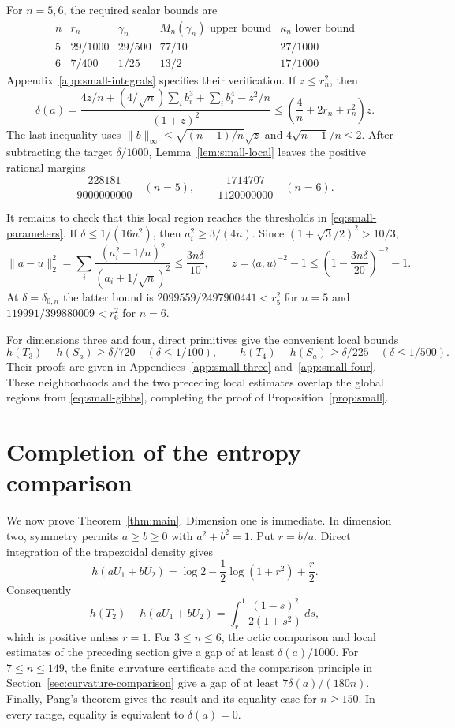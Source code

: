 \documentclass[11pt,a4paper]{article}
\theoremstyle{remark}\newtheorem{remark}[theorem]{Remark}
\begin{document}
For $n=5,6$, the required scalar bounds are
\[
\begin{array}{c|cccc}
 n&r_n&\gamma_n&M_n(\gamma_n)\text{ upper bound}&\kappa_n\text{ lower bound}\\\hline
 5&29/1000&29/500&77/10&27/1000\\
 6&7/400&1/25&13/2&17/1000
\end{array}
\]
Appendix~\ref{app:small-integrals} specifies their verification.
If $z\le r_n^2$, then
\[
 \delta(a)=\frac{4z/n+(4/\sqrt n)\sum_i b_i^3+\sum_i b_i^4-z^2/n}
                 {(1+z)^2}
 \le\left(\frac4n+2r_n+r_n^2\right)z.
\]
The last inequality uses
$\|b\|_\infty\le\sqrt{(n-1)/n}\sqrt z$ and
$4\sqrt{n-1}/n\le2$. After subtracting the target $\delta/1000$,
Lemma~\ref{lem:small-local} leaves the positive rational margins
\[
 \frac{228181}{9000000000}\quad(n=5),\qquad
 \frac{1714707}{1120000000}\quad(n=6).
\]

It remains to check that this local region reaches the thresholds in
\eqref{eq:small-parameters}. If $\delta\le1/(16n^2)$, then
$a_i^2\ge3/(4n)$. Since $(1+\sqrt3/2)^2>10/3$,
\[
 \|a-u\|_2^2
 =\sum_i\frac{(a_i^2-1/n)^2}{(a_i+1/\sqrt n)^2}
 \le\frac{3n\delta}{10},\qquad
 z=\langle a,u\rangle^{-2}-1
 \le\left(1-\frac{3n\delta}{20}\right)^{-2}-1.
\]
At $\delta=\delta_{0,n}$ the latter bound is
$2099559/2497900441<r_5^2$ for $n=5$ and
$119991/399880009<r_6^2$ for $n=6$.

For dimensions three and four, direct primitives give the convenient
local bounds
\[
 h(T_3)-h(S_a)\ge\delta/720\quad(\delta\le1/100),\qquad
 h(T_4)-h(S_a)\ge\delta/225\quad(\delta\le1/500).
\]
Their proofs are given in Appendices~\ref{app:small-three}
and~\ref{app:small-four}. These neighborhoods and the two preceding
local estimates overlap the global regions from
\eqref{eq:small-gibbs}, completing the proof of
Proposition~\ref{prop:small}.

\section{Completion of the entropy comparison}\label{sec:completion}
We now prove Theorem~\ref{thm:main}. Dimension one is immediate. In
dimension two, symmetry permits $a\ge b\ge0$ with $a^2+b^2=1$.
Put $r=b/a$. Direct integration of the trapezoidal density gives
\[
 h(aU_1+bU_2)=\log2-\frac12\log(1+r^2)+\frac r2.
\]
Consequently
\[
 h(T_2)-h(aU_1+bU_2)
 =\int_r^1\frac{(1-s)^2}{2(1+s^2)}\,ds,
\]
which is positive unless $r=1$. For $3\le n\le6$, the octic comparison
and local estimates of the preceding section give a gap of at least
$\delta(a)/1000$. For $7\le n\le149$, the finite curvature certificate
and the comparison principle in Section~\ref{sec:curvature-comparison} give a gap of
at least $7\delta(a)/(180n)$. Finally, Pang's theorem \cite[Theorem~1.1]{Pang}
gives the result and its equality case for $n\ge150$. In every range,
equality is equivalent to $\delta(a)=0$.
\end{document}
